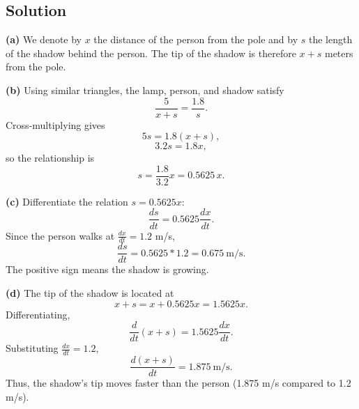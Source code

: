\subsection*{Solution}

    \textbf{(a)}
    We denote by $x$ the distance of the person from the pole and by $s$ the 
    length of the shadow behind the person. The tip of the shadow is therefore 
    $x+s$ meters from the pole.

    \textbf{(b)}
    Using similar triangles, the lamp, person, and shadow satisfy
    \[
        \frac{5}{x+s} = \frac{1.8}{s}.
    \]
    Cross-multiplying gives
    \[
        5s = 1.8(x+s),
    \]
    \[
        3.2s = 1.8x,
    \]
    so the relationship is
    \[
        \boxed{s = \frac{1.8}{3.2}x = 0.5625\,x}.
    \]

    \textbf{(c)} 
    Differentiate the relation $s = 0.5625x$:
    \[
        \frac{ds}{dt} = 0.5625 \frac{dx}{dt}.
    \]
    Since the person walks at $\frac{dx}{dt} = 1.2$ m/s,
    \[
        \frac{ds}{dt} = 0.5625 * 1.2 = 0.675\ \text{m/s}.
    \]
    The positive sign means the shadow is growing.

    \textbf{(d)}
    The tip of the shadow is located at
    \[
        x+s = x + 0.5625x = 1.5625x.
    \]
    Differentiating,
    \[
        \frac{d}{dt}(x+s) = 1.5625\frac{dx}{dt}.
    \]
    Substituting $\frac{dx}{dt}=1.2$,
    \[
        \frac{d(x+s)}{dt} = 1.875\ \text{m/s}.
    \]
    Thus, the shadow’s tip moves faster than the person (1.875 m/s compared to 1.2 m/s).

\pagebreak